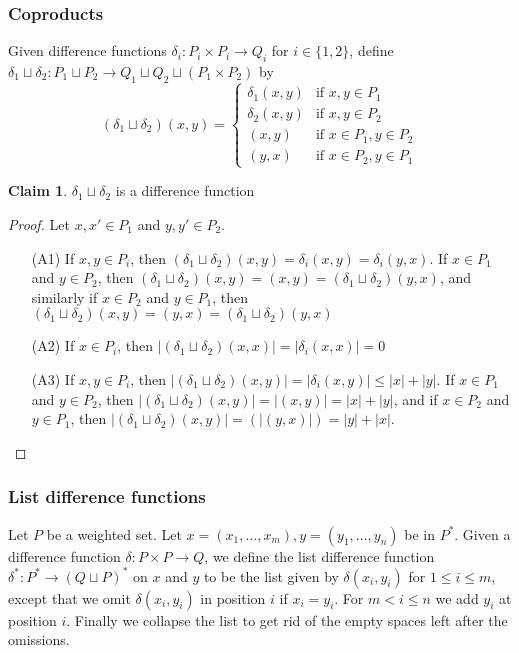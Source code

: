 \documentclass[acmsmall,review,anonymous]{acmart}\settopmatter{printfolios=true,printccs=false,printacmref=false}
\theoremstyle{definition}
\newtheorem{claim}{Claim}
\begin{document}
\subsubsection{Coproducts}
Given difference functions $\delta_i: P_i \times P_i \longrightarrow Q_i$ for
$i \in \{1,2\}$, define $\delta_1 \sqcup \delta_2 :P_1 \sqcup P_2
\longrightarrow Q_1 \sqcup Q_2 \sqcup (P_1 \times P_2)$ by
$$(\delta_1 \sqcup \delta_2)(x, y) =
\begin{cases}
\delta_1(x, y) & \text{if }x, y \in P_1\\
\delta_2(x, y) & \text{if }x, y \in P_2\\
(x, y) & \text{if }x \in P_1, y \in P_2\\
(y, x) & \text{if }x \in P_2, y \in P_1
\end{cases}$$
\begin{claim}
$\delta_1 \sqcup \delta_2$ is a difference function
\end{claim}
\begin{proof}
Let $x, x' \in P_1$ and $y, y' \in P_2$.
\begin{enumerate}
  \item[(A1)]
  If $x, y \in P_i$, then $(\delta_1 \sqcup \delta_2)(x, y) = \delta_i(x, y) =
  \delta_i(y, x)$. If $x \in P_1$ and $y \in P_2$, then $(\delta_1 \sqcup
  \delta_2)(x, y) = (x, y) = (\delta_1 \sqcup \delta_2)(y, x)$, and similarly
  if $x \in P_2$ and $y \in P_1$, then $(\delta_1 \sqcup \delta_2)(x, y) =
  (y,x) = (\delta_1 \sqcup \delta_2)(y, x)$
  \item[(A2)] If $x \in P_i$, then $|(\delta_1 \sqcup \delta_2)(x, x)| =
  |\delta_i(x, x)| = 0$
  \item[(A3)]
  If $x, y \in P_i$, then $|(\delta_1 \sqcup \delta_2)(x, y)| = |\delta_i(x, y)|
  \leq |x| + |y|$. If $x \in P_1$ and $y \in P_2$, then $|(\delta_1 \sqcup
  \delta_2)(x, y)| = |(x, y)| = |x| + |y|$, and if $x \in P_2$ and $y \in
  P_1$, then $|(\delta_1 \sqcup \delta_2)(x, y)| = (|(y, x)|) = |y| + |x|$.
\end{enumerate}
\end{proof}
\subsubsection{List difference functions}
Let $P$ be a weighted set. Let $x=(x_1, \ldots, x_m), y=(y_1, \ldots, y_n)$ be
in $P^*$. Given a difference function $\delta: P \times P \longrightarrow Q$, we
define the list difference function $\delta^*:P^* \longrightarrow (Q \sqcup
P)^*$ on $x$ and $y$ to be the list given by $\delta(x_i, y_i)$ for $1 \leq i
\leq m$, except that we omit $\delta(x_i, y_i)$ in position $i$ if $x_i = y_i$.
For $m < i \leq n$ we add $y_i$ at position $i$. Finally we collapse the list
to get rid of the empty spaces left after the omissions.
\end{document}
